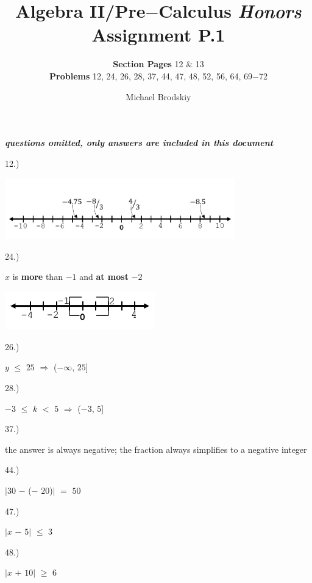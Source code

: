 \documentclass[12pt]{article}
\title{\textbf{Algebra II/Pre$-$Calculus \textit{Honors}}  \\ Assignment P.1}
\date{}
\subtitle{\textbf{Section Pages} 12 \& 13\\\textbf{Problems} 12, 24, 26, 28, 37, 44, 47, 48, 52, 56, 64, 69$-$72}
\author{Michael Brodskiy}
\begin{document}
\maketitle
\begin{center} \textbf{\textit{questions omitted, only answers are included in this document\\}} \end{center} 
{\setlength{\parindent}{0cm}
12.) 
    \begin{center} \includegraphics[width=100mm]{number_line.png} \end{center}
}
{\setlength{\parindent}{0cm}
24.) 
    \begin{center} $x$ is \textbf{more} than $-1$ and \textbf{at most} $-2$ \end{center}
    \begin{center} \includegraphics[width=65mm]{line_segment.png} \end{center}
}
{\setlength{\parindent}{0cm}
26.) 
    \begin{center} $y$ $\leq$ $25$ $\Longrightarrow$ ($-\infty$, $25$] \end{center}
}
{\setlength{\parindent}{0cm}
28.)
    \begin{center} $-3$ $\leq$ $k$ $<$ $5$ $\Longrightarrow$ ($-3$, $5$] \end{center}
}
{\setlength{\parindent}{0cm}
37.) 
    \begin{center} the answer is always negative; the fraction always simplifies to a negative integer \end{center}
}
{\setlength{\parindent}{0cm}
44.) 
    \begin{center} $|30$ $-$ ($-$ $20$)$|$ $=$ $50$ \end{center}
}
{\setlength{\parindent}{0cm}
47.) 
    \begin{center} $|x$ $-$ $5|$ $\leq$ $3$ \end{center}
}
{\setlength{\parindent}{0cm}
48.) 
    \begin{center} $|x$ $+$ $10|$ $\geq$ $6$ \end{center}
}
\end{document}
